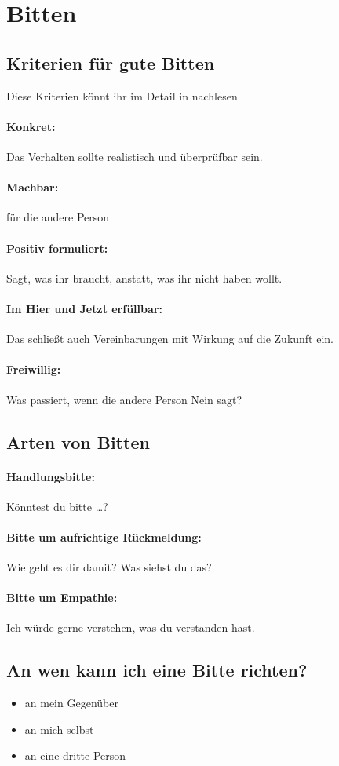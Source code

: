 \section{Bitten}


\subsection{Kriterien für gute Bitten}

Diese Kriterien könnt ihr im Detail in \cite[S. 85f]{gfk-dummies} nachlesen

\paragraph{Konkret:} Das Verhalten sollte realistisch und überprüfbar sein.

\paragraph{Machbar:} für die andere Person

\paragraph{Positiv formuliert:} Sagt, was ihr braucht, anstatt, was ihr nicht haben wollt.

\paragraph{Im Hier und Jetzt erfüllbar:} Das schließt auch Vereinbarungen mit Wirkung auf die Zukunft ein.

\paragraph{Freiwillig:} Was passiert, wenn die andere Person Nein sagt?


\subsection{Arten von Bitten}

\paragraph{Handlungsbitte:} Könntest du bitte …?

\paragraph{Bitte um aufrichtige Rückmeldung:} Wie geht es dir damit? Was siehst du das?

\paragraph{Bitte um Empathie:} Ich würde gerne verstehen, was du verstanden hast.


\subsection{An wen kann ich eine Bitte richten?}

\begin{itemize}
  \item an mein Gegenüber
  \item an mich selbst
  \item an eine dritte Person
\end{itemize}

